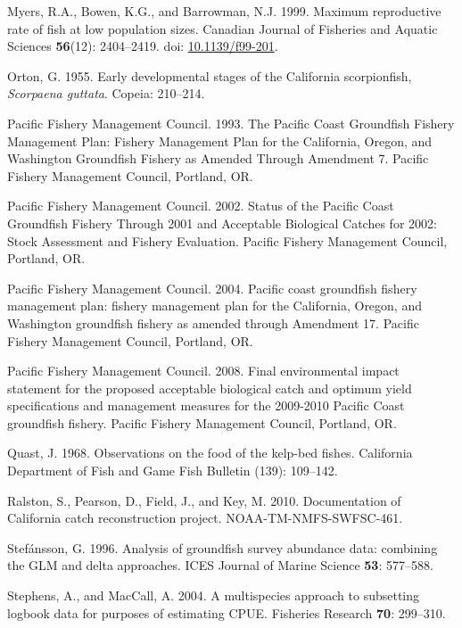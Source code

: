 \documentclass[12pt,]{article}
\begin{document}
\hypertarget{ref-Myers1999}{}
Myers, R.A., Bowen, K.G., and Barrowman, N.J. 1999. Maximum reproductive
rate of fish at low population sizes. Canadian Journal of Fisheries and
Aquatic Sciences \textbf{56}(12): 2404--2419. doi:
\href{https://doi.org/10.1139/f99-201}{10.1139/f99-201}.

\hypertarget{ref-Orton1955}{}
Orton, G. 1955. Early developmental stages of the California
scorpionfish, \emph{Scorpaena guttata}. Copeia: 210--214.

\hypertarget{ref-PFMC1993}{}
Pacific Fishery Management Council. 1993. The Pacific Coast Groundfish
Fishery Management Plan: Fishery Management Plan for the California,
Oregon, and Washington Groundfish Fishery as Amended Through Amendment
7. Pacific Fishery Management Council, Portland, OR.

\hypertarget{ref-PFMC2002}{}
Pacific Fishery Management Council. 2002. Status of the Pacific Coast
Groundfish Fishery Through 2001 and Acceptable Biological Catches for
2002: Stock Assessment and Fishery Evaluation. Pacific Fishery
Management Council, Portland, OR.

\hypertarget{ref-PFMC2004}{}
Pacific Fishery Management Council. 2004. Pacific coast groundfish
fishery management plan: fishery management plan for the California,
Oregon, and Washington groundfish fishery as amended through Amendment
17. Pacific Fishery Management Council, Portland, OR.

\hypertarget{ref-PFMC2008}{}
Pacific Fishery Management Council. 2008. Final environmental impact
statement for the proposed acceptable biological catch and optimum yield
specifications and management measures for the 2009-2010 Pacific Coast
groundfish fishery. Pacific Fishery Management Council, Portland, OR.

\hypertarget{ref-Quast1968}{}
Quast, J. 1968. Observations on the food of the kelp-bed fishes.
California Department of Fish and Game Fish Bulletin (139): 109--142.

\hypertarget{ref-Ralston2010}{}
Ralston, S., Pearson, D., Field, J., and Key, M. 2010. Documentation of
California catch reconstruction project. NOAA-TM-NMFS-SWFSC-461.

\hypertarget{ref-Stefansson1996}{}
Stefánsson, G. 1996. Analysis of groundfish survey abundance data:
combining the GLM and delta approaches. ICES Journal of Marine Science
\textbf{53}: 577--588.

\hypertarget{ref-Stephens2004}{}
Stephens, A., and MacCall, A. 2004. A multispecies approach to
subsetting logbook data for purposes of estimating CPUE. Fisheries
Research \textbf{70}: 299--310.
\end{document}
